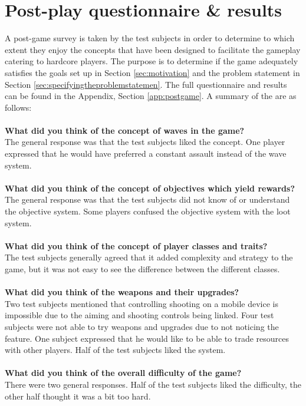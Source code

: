 \section{Post-play questionnaire \& results}
A post-game survey is taken by the test subjects in order to determine to which extent they enjoy the concepts that have been designed to facilitate the gameplay catering to hardcore players.
The purpose is to determine if the game adequately satisfies the goals set up in Section \ref{sec:motivation} and the problem statement in Section \ref{sec:specifyingtheproblemstatemen}.
The full questionnaire and results can be found in the Appendix, Section \ref{app:postgame}.
A summary of the are as follows:\\\\
\textbf{What did you think of the concept of waves in the game?}\\
The general response was that the test subjects liked the concept.
One player expressed that he would have preferred a constant assault instead of the wave system.\\\\
\textbf{What did you think of the concept of objectives which yield rewards?}\\
The general response was that the test subjects did not know of or understand the objective system.
Some players confused the objective system with the loot system.\\\\
\textbf{What did you think of the concept of player classes and traits?}\\
The test subjects generally agreed that it added complexity and strategy to the game, but it was not easy to see the difference between the different classes.\\\\
\textbf{What did you think of the weapons and their upgrades?}\\
Two test subjects mentioned that controlling shooting on a mobile device is impossible due to the aiming and shooting controls being linked.
Four test subjects were not able to try weapons and upgrades due to not noticing the feature.
One subject expressed that he would like to be able to trade resources with other players.
Half of the test subjects liked the system.\\\\
\textbf{What did you think of the overall difficulty of the game?}\\
There were two general responses.
Half of the test subjects liked the difficulty, the other half thought it was a bit too hard.
